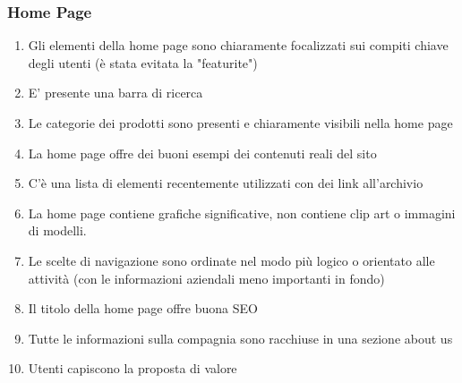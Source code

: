 \documentclass[../Report.tex]{subfiles}
\begin{document}
    \subsubsection{Home Page}
    \begin{enumerate}
        \item Gli elementi della home page sono chiaramente focalizzati sui compiti chiave degli utenti (è stata evitata la "featurite")
        \item E’ presente una barra di ricerca 
        \item Le categorie dei prodotti sono presenti e chiaramente visibili nella home page
        \item La home page offre dei buoni esempi dei contenuti reali del sito 
        \item C’è una lista di elementi recentemente utilizzati con dei link all’archivio
        \item La home page contiene grafiche significative, non contiene clip art o immagini di modelli.
        \item Le scelte di navigazione sono ordinate nel modo più logico o orientato alle attività (con le informazioni aziendali meno importanti in fondo)
        \item Il titolo della home page offre buona SEO 
        \item Tutte le informazioni sulla compagnia sono racchiuse in una sezione about us
        \item Utenti capiscono la proposta di valore
    \end{enumerate}
\end{document}
